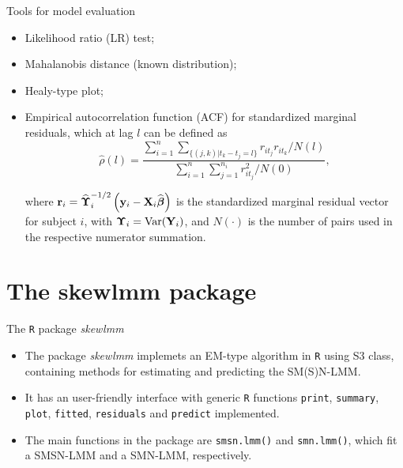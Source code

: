 \begin{frame}{Tools for model evaluation}
\protect\hypertarget{tools-for-model-evaluation}{}
\begin{itemize}\sepvfill
    \item Likelihood ratio (LR) test;
    \item Mahalanobis distance (known distribution);
    \item Healy-type plot;
    \item Empirical autocorrelation function (ACF) for standardized marginal residuals, which at lag $l$ can be defined as
\vspace{-.2cm}\begin{equation*}
    \widehat{\rho}(l) = \frac{\sum_{i=1}^n \sum_{\{ (j,k) |t_k-t_j=l\}} r_{it_j} r_{it_k} / N(l)}{
    \sum_{i=1}^n \sum_{j=1}^{n_i} r_{it_j}^2/N(0) },
\end{equation*}

\vspace{-.4cm}
where $\textbf{r}_i = \widehat{\mbox{${ \bm \Upsilon}$}}_i^{-1/2}\left(\mathbf{y}_i - \textbf{X}_i\widehat{\mbox{${\bm \beta}$}} \right)$ is the standardized marginal residual vector for subject $i$, with $\mbox{${ \bm \Upsilon}$}_i=\text{Var}(\mathbf{Y}_i)$, and $N(\cdot)$ is the number of pairs used in the respective numerator summation.
\end{itemize}

\end{frame}

\section{The skewlmm package}
\begin{frame}[fragile]{The \texttt{R} package \emph{skewlmm}}
\protect\hypertarget{the-package}{}

\begin{itemize}\sepvfill
\item
  The package \emph{skewlmm} implemets an EM-type algorithm in
  \texttt{R} using S3 class, containing methods for estimating and
  predicting the SM(S)N-LMM.
\item
  It has an user-friendly interface with generic \texttt{R} functions
  \texttt{print}, \texttt{summary}, \texttt{plot}, \texttt{fitted},
  \texttt{residuals} and \texttt{predict} implemented.
\item
  The main functions in the package are \texttt{smsn.lmm()} and
  \texttt{smn.lmm()}, which fit a SMSN-LMM and a SMN-LMM, respectively.
\end{itemize}

\end{frame}

